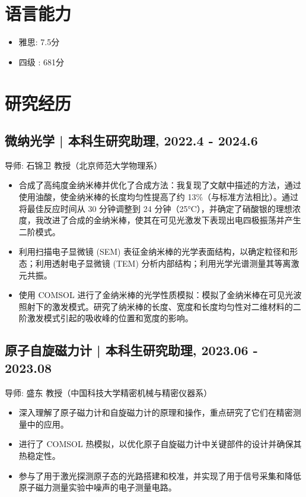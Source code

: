 \documentclass{article}
\begin{document}
\section*{语言能力}
\begin{itemize}
    \item 雅思: 7.5分
    \item 四级 : 681分
\end{itemize}

\section*{研究经历}
\subsection*{微纳光学 | 本科生研究助理, 2022.4 - 2024.6}
导师: 石锦卫 教授（北京师范大学物理系）
\begin{itemize}
    \item 合成了高纯度金纳米棒并优化了合成方法：我复现了文献中描述的方法，通过使用油酸，使金纳米棒的长度均匀性提高了约 13\%（与标准方法相比）。通过将最佳反应时间从 30 分钟调整到 24 分钟（25°C），并确定了硝酸银的理想浓度，我改进了合成的金纳米棒，使其在可见光激发下表现出电四极振荡并产生二阶模式。
    \item 利用扫描电子显微镜 (SEM) 表征金纳米棒的光学表面结构，以确定粒径和形态；利用透射电子显微镜 (TEM) 分析内部结构；利用光学光谱测量其等离激元共振。
    \item 使用 COMSOL 进行了金纳米棒的光学性质模拟：模拟了金纳米棒在可见光波照射下的激发模式。研究了纳米棒的长度、宽度和长度均匀性对二维材料的二阶激发模式引起的吸收峰的位置和宽度的影响。
\end{itemize}

\subsection*{原子自旋磁力计 | 本科生研究助理, 2023.06 - 2023.08}
导师: 盛东 教授（中国科技大学精密机械与精密仪器系）
\begin{itemize}
    \item 深入理解了原子磁力计和自旋磁力计的原理和操作，重点研究了它们在精密测量中的应用。
    \item 进行了 COMSOL 热模拟，以优化原子自旋磁力计中关键部件的设计并确保其热稳定性。
    \item 参与了用于激光探测原子态的光路搭建和校准，并实现了用于信号采集和降低原子磁力测量实验中噪声的电子测量电路。
\end{itemize}
\end{document}

